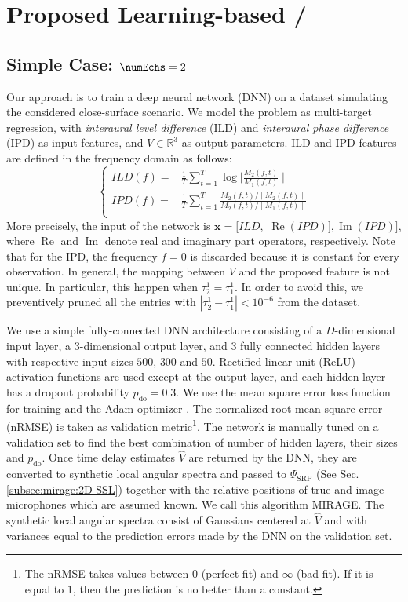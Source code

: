 \section{Proposed Learning-based \AER/}

\subsection{Simple Case: $\numEchs = 2$}

Our approach is to train a deep neural network (DNN) on a dataset simulating the considered close-surface scenario.
We model the problem as multi-target regression, with \textit{interaural level difference} (ILD)
and \textit{interaural phase difference} (IPD) as input features, and $V \in \mathbb{R}^3$ as output parameters.
ILD and IPD features are defined in the frequency domain as follows:
\begin{equation}
\label{eq:mirage:features}
\begin{cases}
ILD(f)  =& \tfrac{1}{T} \sum_{t=1}^T \log{\mid \frac{M_2(f,t)}{M_1(f,t)} \mid } \\
IPD(f)  =& \tfrac{1}{T} \sum_{t=1}^T \frac{M_2(f,t)/ \mid M_2(f,t) \mid }{M_2(f,t) / \mid M_1(f,t)  \mid}\\
\end{cases}
\end{equation}
More precisely, the input of the network is
$\mathbf{x} = [ILD,$ $\operatorname{Re}(IPD)], \operatorname{Im}(IPD)]$, where $\operatorname{Re}$
and $\operatorname{Im}$ denote real and imaginary part operators, respectively.
Note that for the IPD, the frequency $f=0$ is discarded because it is constant for every observation.
In general, the mapping between $V$ and the proposed feature is not unique.
In particular, this happen when $\tau_2^1 = \tau_1^1$.
In order to avoid this, we preventively pruned all the entries
with $| \tau_2^1 - \tau_1^1 | < 10^{-6}$ from the dataset.

We use a simple fully-connected DNN architecture consisting of a $D$-dimensional input layer,
a $3$-dimensional output layer, and 3 fully connected hidden layers with respective input
sizes $500$, $300$ and $50$. Rectified linear unit (ReLU)
activation functions are used except at the output layer,
and each hidden layer has a dropout probability $p_\text{do} = 0.3$.
We use the mean square error loss function for training and the Adam optimizer \cite{kingma2014adam}.
The normalized root mean square error (nRMSE) is taken as validation
metric\footnote{The nRMSE takes values between $0$ (perfect fit) and $\infty$ (bad fit).
If it is equal to $1$, then the prediction is no better than a constant.}.
The network is manually tuned on a validation set to find the best combination of number of hidden layers, their sizes and $p_\text{do}$.
Once time delay estimates $\hat{V}$ are returned by the DNN, they are converted to synthetic
local angular spectra and passed to $\Psi_\text{SRP}$ (See Sec. \cref{subsec:mirage:2D-SSL})
together with the relative positions of true and image microphones which are assumed known.
We call this algorithm MIRAGE. The synthetic local angular spectra consist of Gaussians
centered at $\hat{V}$ and with variances equal to the prediction errors made by
the DNN on the validation set.

